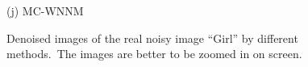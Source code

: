 \documentclass[10pt,onecolumn,letterpaper]{article}
\begin{document}
\begin{figure}[!htbp]
{\begin{minipage}[t]{0.3\textwidth}
{\footnotesize (j) MC-WNNM  }
\end{minipage}
}
\vspace{-1mm}
\caption{Denoised images of the real noisy image ``Girl'' \cite{ncwebsite} by different methods.\ The images are better to be zoomed in on screen.}
\label{f8}
\end{figure}


\begin{figure}[!htbp]
\centering
\vspace{-2mm}
\vspace{-4mm}
\end{figure}
\end{document}
